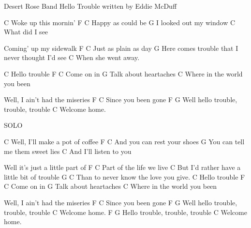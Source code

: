 
Desert Rose Band   Hello Trouble written by Eddie McDuff
                                           
C
Woke up this mornin'
      F         C
Happy as could  be
                 G
I looked out my   window
            C
What did I  see

Coming' up my sidewalk
F                 C
Just as plain as  day
                                        G
Here comes trouble that I never thought I'd  see
              C
When she went away.

C
Hello  trouble
F       C
Come on in
           G
Talk about heartaches
                       C
Where in the world you been

Well, I ain't had the miseries
      F        C
Since you been  gone
            F                  G
Well  hello trouble, trouble,  trouble
        C
Welcome home.

SOLO

C
Well, I'll make a pot of coffee
             F         C
And you  can rest your shoes
                     G
You can tell me them sweet lies
                   C
And I'll listen to you

Well it's just a little part of
            F       C
Part of the life we live
C
But I'd rather have a little bit of trouble
        G                        C
Than to never know the love you give.
C
Hello  trouble
F       C
Come on in
           G
Talk about heartaches
                       C
Where in the world you been

Well, I ain't had the miseries
      F        C
Since you been  gone
            F                  G
Well  hello trouble, trouble,  trouble
        C
Welcome home.
F                        G
Hello trouble, trouble,  trouble
        C
Welcome home.




